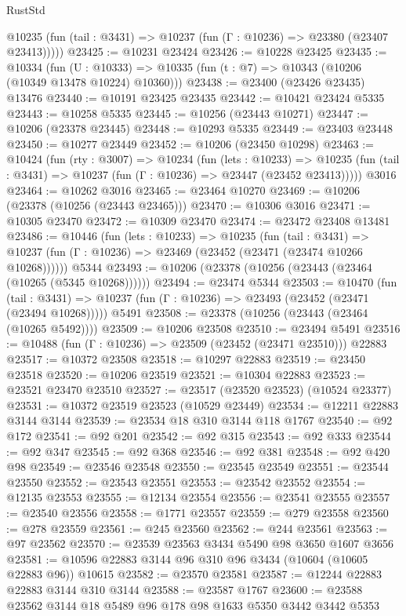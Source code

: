\begin{lexlean}{RustStd}
\begin{coremodule}
      @10235 (fun (tail : @3431) => @10237 (fun (Γ : @10236) => @23380 (@23407 @23413)))))
@23425 := @10231 @23424
@23426 := @10228 @23425
@23435 := @10334
    (fun (U : @10333) => @10335 (fun (t : @7) => @10343 (@10206 (@10349 @13478 @10224) @10360)))
@23438 := @23400 (@23426 @23435) @13476
@23440 := @10191 @23425 @23435
@23442 := @10421 @23424 @5335
@23443 := @10258 @5335
@23445 := @10256 (@23443 @10271)
@23447 := @10206 (@23378 @23445)
@23448 := @10293 @5335
@23449 := @23403 @23448
@23450 := @10277 @23449
@23452 := @10206 (@23450 @10298)
@23463 := @10424
    (fun (rty : @3007) =>
    @10234
      (fun (lets : @10233) =>
      @10235 (fun (tail : @3431) => @10237 (fun (Γ : @10236) => @23447 (@23452 @23413)))))
    @3016
@23464 := @10262 @3016
@23465 := @23464 @10270
@23469 := @10206 (@23378 (@10256 (@23443 @23465)))
@23470 := @10306 @3016
@23471 := @10305 @23470
@23472 := @10309 @23470
@23474 := @23472 @23408 @13481
@23486 := @10446
    (fun (lets : @10233) =>
    @10235
      (fun (tail : @3431) =>
      @10237 (fun (Γ : @10236) => @23469 (@23452 (@23471 (@23474 @10266 @10268))))))
    @5344
@23493 := @10206 (@23378 (@10256 (@23443 (@23464 (@10265 (@5345 @10268))))))
@23494 := @23474 @5344
@23503 := @10470
    (fun (tail : @3431) => @10237 (fun (Γ : @10236) => @23493 (@23452 (@23471 (@23494 @10268)))))
    @5491
@23508 := @23378 (@10256 (@23443 (@23464 (@10265 @5492))))
@23509 := @10206 @23508
@23510 := @23494 @5491
@23516 := @10488 (fun (Γ : @10236) => @23509 (@23452 (@23471 @23510))) @22883
@23517 := @10372 @23508
@23518 := @10297 @22883
@23519 := @23450 @23518
@23520 := @10206 @23519
@23521 := @10304 @22883
@23523 := @23521 @23470 @23510
@23527 := @23517 (@23520 @23523) (@10524 @23377)
@23531 := @10372 @23519 @23523 (@10529 @23449)
@23534 := @12211 @22883 @3144 @3144
@23539 := @23534 @18 @310 @3144 @118 @1767
@23540 := @92 @172
@23541 := @92 @201
@23542 := @92 @315
@23543 := @92 @333
@23544 := @92 @347
@23545 := @92 @368
@23546 := @92 @381
@23548 := @92 @420 @98
@23549 := @23546 @23548
@23550 := @23545 @23549
@23551 := @23544 @23550
@23552 := @23543 @23551
@23553 := @23542 @23552
@23554 := @12135 @23553
@23555 := @12134 @23554
@23556 := @23541 @23555
@23557 := @23540 @23556
@23558 := @1771 @23557
@23559 := @279 @23558
@23560 := @278 @23559
@23561 := @245 @23560
@23562 := @244 @23561
@23563 := @97 @23562
@23570 := @23539 @23563 @3434 @5490 @98 @3650 @1607 @3656
@23581 := @10596 @22883 @3144 @96 @310 @96 @3434 (@10604 (@10605 @22883 @96)) @10615
@23582 := @23570 @23581
@23587 := @12244 @22883 @22883 @3144 @310 @3144
@23588 := @23587 @1767
@23600 := @23588 @23562 @3144 @18 @5489 @96 @178 @98 @1633 @5350 @3442 @3442 @5353

\end{coremodule}
\end{lexlean}
